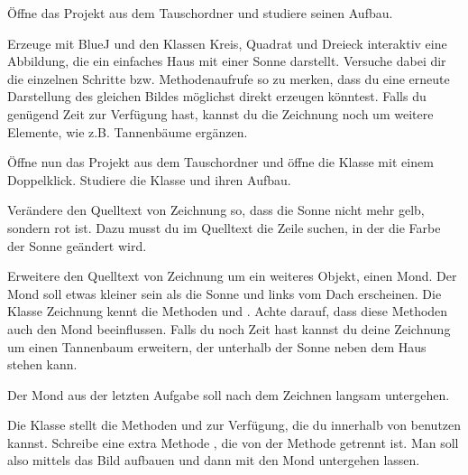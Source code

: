 \documentclass[11pt, a4paper]{arbeitsblatt}
\begin{document}
\ReiheTitel

\begin{aufgabe}
	Öffne das Projekt  aus dem Tauschordner und studiere seinen Aufbau.

	\begin{teilaufgaben}
		\teilaufgabe Erzeuge mit BlueJ und den Klassen Kreis, Quadrat und Dreieck interaktiv eine Abbildung, die ein einfaches Haus mit einer Sonne darstellt.
		\teilaufgabe Versuche dabei dir die einzelnen Schritte bzw. Methodenaufrufe so zu merken, dass du eine erneute Darstellung des gleichen Bildes möglichst direkt erzeugen könntest.
		\teilaufgabe Falls du genügend Zeit zur Verfügung hast, kannst du die Zeichnung noch um weitere Elemente, wie z.B. Tannenbäume ergänzen.
	\end{teilaufgaben}
\end{aufgabe}

\begin{aufgabe}
	Öffne nun das Projekt  aus dem Tauschordner und öffne die Klasse  mit einem Doppelklick. Studiere die Klasse und ihren Aufbau.

	Verändere den Quelltext von Zeichnung so, dass die Sonne nicht mehr gelb, sondern rot ist. Dazu musst du im Quelltext die Zeile suchen, in der die Farbe der Sonne geändert wird.
\end{aufgabe}

\begin{aufgabe}
	\begin{teilaufgaben}
		\teilaufgabe Erweitere den Quelltext von Zeichnung um ein weiteres Objekt, einen Mond. Der Mond soll etwas kleiner sein als die Sonne und links vom Dach erscheinen.
		\teilaufgabe Die Klasse Zeichnung kennt die Methoden  und . Achte darauf, dass diese Methoden auch den Mond beeinflussen.
		\teilaufgabe Falls du noch Zeit hast kannst du deine Zeichnung um einen Tannenbaum erweitern, der unterhalb der Sonne neben dem Haus stehen kann.
	\end{teilaufgaben}
\end{aufgabe}

\begin{aufgabe}
	Der Mond aus der letzten Aufgabe soll nach dem Zeichnen langsam untergehen.

	\begin{teilaufgaben}
		\teilaufgabe Die Klasse  stellt die Methoden  und  zur Verfügung, die du innerhalb von  benutzen kannst.
		\teilaufgabe Schreibe eine extra Methode , die von der Methode  getrennt ist. Man soll also mittels  das Bild aufbauen und dann mit  den Mond untergehen lassen.
	\end{teilaufgaben}
\end{aufgabe}
\end{document}
